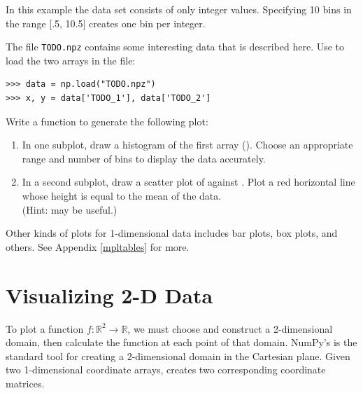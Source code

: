 In this example the data set  consists of only integer values.
Specifying 10 bins in the range [.5, 10.5] creates one bin per integer.

\begin{problem} %
\label{prob:subplot}
The file \texttt{TODO.npz} contains some interesting data that is described here.
Use  to load the two arrays in the file:
\begin{lstlisting}
>>> data = np.load("TODO.npz")
>>> x, y = data['TODO_1'], data['TODO_2']
\end{lstlisting}

Write a function to generate the following plot:
\begin{enumerate}
\item In one subplot, draw a histogram of the first array ().
Choose an appropriate range and number of bins to display the data accurately.
\item In a second subplot, draw a scatter plot of  against .
Plot a red horizontal line whose height is equal to the mean of the  data.\\
(Hint:  may be useful.)
\end{enumerate}
\end{problem}

Other kinds of plots for 1-dimensional data includes bar plots, box plots, and others.
See Appendix \ref{mpltables} for more.

\section*{Visualizing 2-D Data} %

To plot a function $f: \mathbb{R}^2 \rightarrow \mathbb{R}$, we must choose and construct a 2-dimensional domain, then calculate the function at each point of that domain.
NumPy's  is the standard tool for creating a 2-dimensional domain in the Cartesian plane.
Given two 1-dimensional coordinate arrays,  creates two corresponding coordinate matrices.

